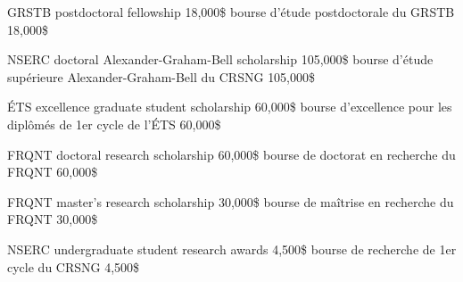 \documentclass[print]{friggeri-cv}
\begin{document}

\begin{entrylist}

  \engfr
  { {{\small GRSTB} postdoctoral fellowship} {18,000\$} {\vspace{-3mm}}}
  { {bourse d’étude postdoctorale du {\small GRSTB}} {18,000\$} {\vspace{-3mm}}}


  \engfr
  { {{\small NSERC} doctoral Alexander-Graham-Bell scholarship} {105,000\$} {\vspace{-3mm}}}
  { {bourse d’étude supérieure Alexander-Graham-Bell du {\small CRSNG}} {105,000\$} {\vspace{-3mm}}}

  \engfr
  { {{\small ÉTS} excellence graduate student scholarship} {60,000\$} {\vspace{-3mm}}}
  { {bourse d'excellence pour les diplômés de 1er cycle de l'ÉTS} {60,000\$} {\vspace{-3mm}}}

  \engfr
  { {{\small FRQNT} doctoral research scholarship} {60,000\$} {\vspace{-3mm}}}
  { {bourse de doctorat en recherche du {\small FRQNT}} {60,000\$} {\vspace{-3mm}}}

  \engfr
  { {{\small FRQNT} master's research scholarship} {30,000\$} {\vspace{-3mm}}}
  { {bourse de maîtrise en recherche du {\small FRQNT}} {30,000\$} {\vspace{-3mm}}}

  \engfr
  { {{\small NSERC} undergraduate student research awards} {4,500\$} {\vspace{-3mm}}}
  { {bourse de recherche de 1er cycle du {\small CRSNG}} {4,500\$} {\vspace{-3mm}}}
\end{entrylist}
\end{document}
